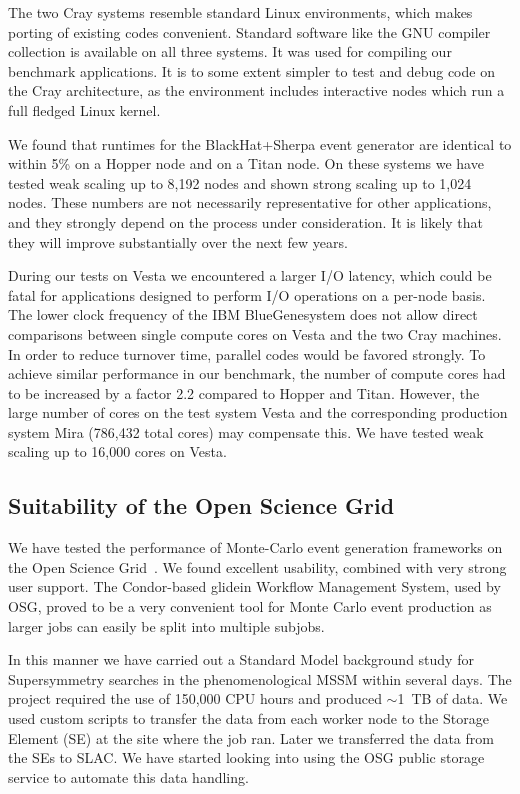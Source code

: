 The two Cray systems resemble standard Linux environments,
which makes porting of existing codes convenient. Standard software
like the GNU compiler collection is available on all three systems. 
It was used for compiling our benchmark applications. It is to some 
extent simpler to test and debug code on the Cray architecture, 
as the environment includes interactive nodes which run a full fledged
Linux kernel.

We found that runtimes for the BlackHat+Sherpa event generator are identical 
to within 5\% on a Hopper node and on a Titan node. On these systems we have 
tested weak scaling up to 8,192 nodes and shown strong scaling up to 1,024 nodes.
These numbers are not necessarily representative for other applications, 
and they strongly depend on the process under consideration. 
It is likely that they will improve substantially over the next few years.

During our
tests on Vesta we encountered a larger I/O latency, which could be fatal for applications
designed to perform I/O operations on a per-node basis. The lower clock frequency 
of the IBM BlueGene\registered system does not allow direct comparisons between single 
compute cores on Vesta and the two Cray machines. In order to reduce turnover time, 
parallel codes would be favored strongly. To achieve similar performance 
in our benchmark, the number of compute cores had to be increased by 
a factor 2.2 compared to Hopper and Titan. However, the large number of cores 
on the test system Vesta and the corresponding production system Mira (786,432 total cores) 
may compensate this. We have tested weak scaling up to 16,000 cores on Vesta. 

\subsection{Suitability of the Open Science Grid}
We have tested the performance of Monte-Carlo event generation frameworks
on the Open Science Grid~\cite{Altunay:2010zz,OSG}. We found excellent usability, 
combined with very strong user support. 
The Condor-based glidein Workflow Management System, used by OSG, 
proved to be a very convenient tool for Monte Carlo event production
as larger jobs can easily be split into multiple subjobs.

In this manner we have carried out a Standard Model background 
study for Supersymmetry searches in the phenomenological MSSM within several days. 
The project required the use of 150,000 CPU hours and produced $\sim$1~TB of data. 
We used custom scripts to transfer the data from each worker node to the 
Storage Element (SE) at the site where the job ran. Later we transferred 
the data from the SEs to SLAC. We have started looking into using the 
OSG public storage service to automate this data handling.

